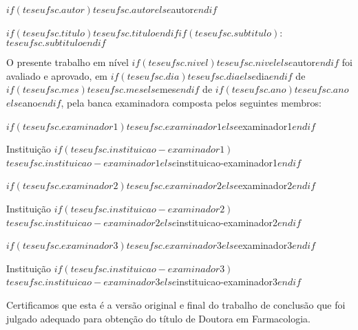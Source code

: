 \begin{center}

\vspace{2em}

$if(teseufsc.autor)$$teseufsc.autor$$else$autor$endif$

\vspace{2em}

\textbf{$if(teseufsc.titulo)$$teseufsc.titulo$$endif$}$if(teseufsc.subtitulo)$: {$teseufsc.subtitulo$}$endif$

\vspace{2em}

O presente trabalho em nível $if(teseufsc.nivel)$$teseufsc.nivel$$else$autor$endif$ foi avaliado e aprovado, em $if(teseufsc.dia)$$teseufsc.dia$$else$dia$endif$ de $if(teseufsc.mes)$$teseufsc.mes$$else$mes$endif$ de $if(teseufsc.ano)$$teseufsc.ano$$else$ano$endif$, pela banca examinadora composta pelos seguintes membros:

\vspace{2em}

$if(teseufsc.examinador1)$$teseufsc.examinador1$$else$examinador1$endif$

Instituição $if(teseufsc.instituicao-examinador1)$$teseufsc.instituicao-examinador1$$else$instituicao-examinador1$endif$

\vspace{2em}

$if(teseufsc.examinador2)$$teseufsc.examinador2$$else$examinador2$endif$

Instituição $if(teseufsc.instituicao-examinador2)$$teseufsc.instituicao-examinador2$$else$instituicao-examinador2$endif$

\vspace{2em}

$if(teseufsc.examinador3)$$teseufsc.examinador3$$else$examinador3$endif$

Instituição $if(teseufsc.instituicao-examinador3)$$teseufsc.instituicao-examinador3$$else$instituicao-examinador3$endif$

\vspace{2em}

Certificamos que esta é a versão original e final do trabalho de conclusão que foi julgado adequado para obtenção do título de Doutora em Farmacologia.

\vspace{3em}

\noindent{}


\end{center}
